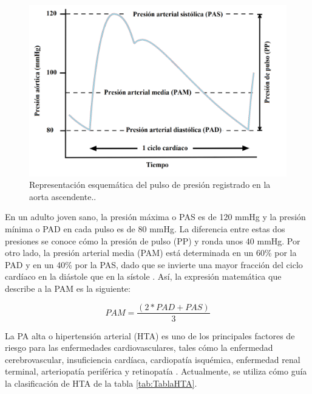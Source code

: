 \begin{figure}[h]
  \centering
  \includegraphics[width=\textwidth]{./Figures/aortic-pulse-pressure.png}
  \caption{Representación esquemática del pulso de presión registrado en la aorta ascendente.\protect\footnotemark.}\label{fig:aorticPulse}
\end{figure}


En un adulto joven sano, la presión máxima o PAS es de 
120 mmHg y la presión mínima o PAD en cada pulso es de 80 mmHg. La diferencia entre estas dos presiones 
se conoce cómo la presión de pulso (PP) y ronda unos 40 mmHg. Por otro lado, la presión arterial media (PAM) 
está determinada en un 60\% por la PAD y en un 40\% por la PAS, dado que se invierte una mayor fracción 
del ciclo cardíaco en la diástole que en la sístole \citep{CITE:2} \citep{CITE:3}. Así, la expresión matemática que describe 
a la PAM es la siguiente: 

\begin{equation}
	\label{eq:PAM}
	PAM = \frac{(2*PAD + PAS)}{3}
\end{equation}

La PA alta o hipertensión arterial (HTA) es uno de los principales factores de riesgo para las enfermedades 
cardiovasculares, tales cómo la enfermedad cerebrovascular, insuficiencia cardíaca, cardiopatía isquémica, 
enfermedad renal terminal, arteriopatía periférica y retinopatía \citep{CITE:6} \citep{CITE:7}. Actualmente, se utiliza cómo guía 
la clasificación de HTA de la tabla \ref{tab:TablaHTA}.

